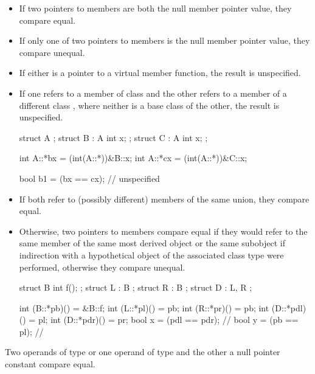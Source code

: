 \begin{itemize}
\item
If two pointers to members are both the null member pointer value, they compare
equal.

\item
If only one of two pointers to members is the null member pointer value, they
compare unequal.

\item
If either is a pointer to a virtual member function, the result is unspecified.

\item
If one refers to a member of class  and the other refers to a member
of a different class , where neither is a base class of the other,
the result is unspecified.
\begin{example}
\begin{codeblock}
struct A {};
struct B : A { int x; };
struct C : A { int x; };

int A::*bx = (int(A::*))&B::x;
int A::*cx = (int(A::*))&C::x;

bool b1 = (bx == cx);   // unspecified
\end{codeblock}
\end{example}

\item
If both refer to (possibly different) members of the same union,
they compare equal.

\item
Otherwise, two pointers to members compare equal if they would refer to the same member of
the same most derived object or the same subobject if
indirection with a hypothetical object of the associated
class type were performed, otherwise they compare unequal.
\begin{example}
\begin{codeblock}
struct B {
  int f();
};
struct L : B { };
struct R : B { };
struct D : L, R { };

int (B::*pb)() = &B::f;
int (L::*pl)() = pb;
int (R::*pr)() = pb;
int (D::*pdl)() = pl;
int (D::*pdr)() = pr;
bool x = (pdl == pdr);          // 
bool y = (pb == pl);            // 
\end{codeblock}
\end{example}
\end{itemize}

\pnum
Two operands of type  or one operand of type
 and the other a null pointer constant compare equal.

